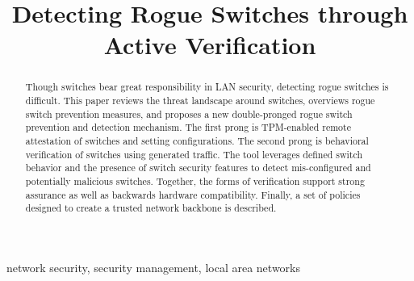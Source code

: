 \documentclass[journal]{IEEEtran}
\begin{document}
\title{Detecting Rogue Switches through Active Verification}

\author{
}

\maketitle



\begin{abstract}
Though switches bear great responsibility in LAN security, detecting rogue switches is
difficult. This paper reviews the threat landscape around switches, overviews rogue switch
prevention measures, and proposes a new double-pronged rogue switch prevention and detection
mechanism. The first prong is TPM-enabled remote attestation of switches and setting configurations.
The second prong is behavioral verification of switches using generated traffic. The tool leverages
defined switch behavior and the presence of switch security features to detect mis-configured and
potentially malicious switches. Together, the forms of verification support strong assurance as well
as backwards hardware compatibility. Finally, a set of policies designed to create a trusted
network backbone is described.

\end{abstract}

\begin{IEEEkeywords}
network security, security management, local area networks
\end{IEEEkeywords}
\end{document}
